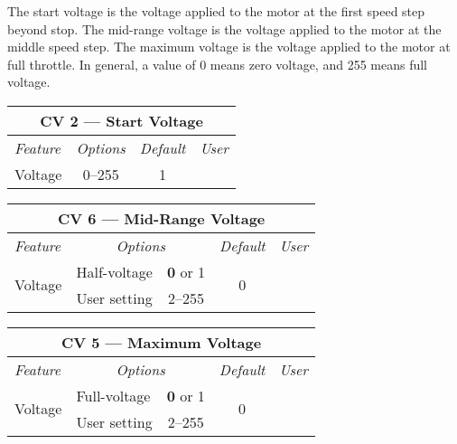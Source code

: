 \documentclass[12pt,letterpaper,draft]{memoir} %
\begin{document}
The start voltage is the voltage applied to the motor at the first speed step beyond stop. The mid-range voltage is the voltage applied to the motor at the middle speed step. The maximum voltage is the voltage applied to the motor at full throttle. In general, a value of 0 means zero voltage, and 255 means full voltage.

\label{CV2}
\begin{center}
\begin{tabular}{|l|c|c|c|}
\hline
\multicolumn{4}{|c|}{\textbf{CV 2 --- Start Voltage}} \\ \hline \hline
\textit{Feature} & \textit{Options} & \textit{Default} & \textit{User} \\ \hline
Voltage & 0--255 & 1 &\\ \hline
\end{tabular}
\end{center}

\label{CV6}
\begin{center}
\begin{tabular}{|l|lc|c|c|}
\hline
\multicolumn{5}{|c|}{\textbf{CV 6 --- Mid-Range Voltage}} \\ \hline \hline
\textit{Feature} & \multicolumn{2}{c|}{\textit{Options}} & \textit{Default} & \textit{User} \\ \hline
\multirow{2}{*}{Voltage}		& Half-voltage		& \textbf{0} or 1 & \multirow{2}{*}{0} 	&\\
			& User setting	 	& 2--255 		& 				& \\ \hline
\end{tabular}
\end{center}

\label{CV5}
\begin{center}
\begin{tabular}{|l|lc|c|c|}
\hline
\multicolumn{5}{|c|}{\textbf{CV 5 --- Maximum Voltage}} \\ \hline \hline
\textit{Feature} & \multicolumn{2}{c|}{\textit{Options}} & \textit{Default} & \textit{User} \\ \hline
\multirow{2}{*}{Voltage}		& Full-voltage		& \textbf{0} or 1 & \multirow{2}{*}{0} 	&\\
			& User setting	 	& 2--255 		& 				& \\ \hline
\end{tabular}
\end{center}
\end{document}
